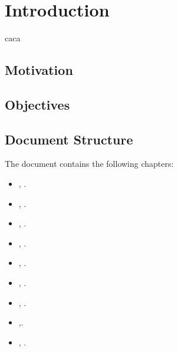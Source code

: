 \chapter{Introduction}\label{chap:introduction}
caca
\section{Motivation}\label{sec:motivation}



\section{Objectives}\label{sec:objectives}

\section{Document Structure}\label{sec:structure}
The document contains the following chapters:
\begin{itemize}
  \item {}, .
  \item {}, .
  \item {}, .
  \item {}, .
  \item {}, .
  \item {}, .
  \item {}, .
  \item {},.
  \item {}, .
\end{itemize}